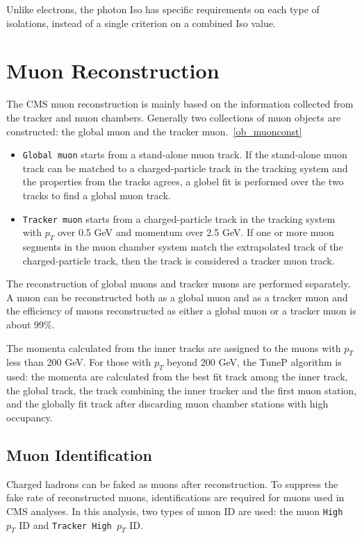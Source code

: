 \vspace{0.3cm}
Unlike electrons, the photon Iso has specific requirements on each type of isolations, instead of a single criterion on a combined Iso value.

\section{Muon Reconstruction}\label{sec:muonrecon}
The CMS muon reconstruction is mainly based on the information collected from the tracker and muon chambers. Generally two collections of muon objects are constructed: the global muon and the tracker muon.~\ref{ob_muonconst}
\begin{itemize}
\item \texttt{Global muon} starts from a stand-alone muon track. If the stand-alone muon track can be matched to a charged-particle track in the tracking system and the properties from the tracks agrees, a globel fit is performed over the two tracks to find a global muon track.
\item \texttt{Tracker muon} starts from a charged-particle track in the tracking system with $p_{T}$ over 0.5 GeV and momentum over 2.5 GeV. If one or more muon segments in the muon chamber system match the extrapolated track of the charged-particle track, then the track is considered a tracker muon track.
\end{itemize}

The reconstruction of global muons and tracker muons are performed separately. A muon can be reconstructed both as a global muon and as a tracker muon and the efficiency of muons reconstructed as either a global muon or a tracker muon is about 99\%.

\vspace{0.3cm}
The momenta calculated from the inner tracks are assigned to the muons with $p_{T}$ less than 200 GeV. For those with $p_T$ beyond 200 GeV, the TuneP algorithm is used: the momenta are calculated from the best fit track among the inner track, the global track, the track combining the inner tracker and the first muon station, and the globally fit track after discarding muon chamber stations with high occupancy. 

\subsection{Muon Identification}
Charged hadrons can be faked as muons after reconstruction. To suppress the fake rate of reconstructed muons, identifications are required for muons used in CMS analyses. In this analysis, two types of muon ID are used: the muon \texttt{High $p_T$} ID and \texttt{Tracker High $p_T$} ID. 

